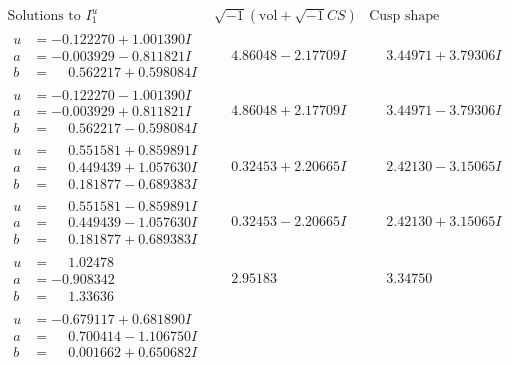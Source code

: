 \documentclass[1p]{elsarticle_modified}
\theoremstyle{definition}
\newcommand{\I}{\sqrt{-1}}
\begin{document}
$$\begin{array}{c|c|c}  
\text{Solutions to }I^u_{1}& \I (\text{vol} + \sqrt{-1}CS) & \text{Cusp shape}\\
 \hline 
\begin{aligned}
u &= -0.122270 + 1.001390 I \\
a &= -0.003929 - 0.811821 I \\
b &= \phantom{-}0.562217 + 0.598084 I\end{aligned}
 & \phantom{-}4.86048 - 2.17709 I & \phantom{-}3.44971 + 3.79306 I \\ \hline\begin{aligned}
u &= -0.122270 - 1.001390 I \\
a &= -0.003929 + 0.811821 I \\
b &= \phantom{-}0.562217 - 0.598084 I\end{aligned}
 & \phantom{-}4.86048 + 2.17709 I & \phantom{-}3.44971 - 3.79306 I \\ \hline\begin{aligned}
u &= \phantom{-}0.551581 + 0.859891 I \\
a &= \phantom{-}0.449439 + 1.057630 I \\
b &= \phantom{-}0.181877 - 0.689383 I\end{aligned}
 & \phantom{-}0.32453 + 2.20665 I & \phantom{-}2.42130 - 3.15065 I \\ \hline\begin{aligned}
u &= \phantom{-}0.551581 - 0.859891 I \\
a &= \phantom{-}0.449439 - 1.057630 I \\
b &= \phantom{-}0.181877 + 0.689383 I\end{aligned}
 & \phantom{-}0.32453 - 2.20665 I & \phantom{-}2.42130 + 3.15065 I \\ \hline\begin{aligned}
u &= \phantom{-}1.02478\phantom{ +0.000000I} \\
a &= -0.908342\phantom{ +0.000000I} \\
b &= \phantom{-}1.33636\phantom{ +0.000000I}\end{aligned}
 & \phantom{-}2.95183\phantom{ +0.000000I} & \phantom{-}3.34750\phantom{ +0.000000I} \\ \hline\begin{aligned}
u &= -0.679117 + 0.681890 I \\
a &= \phantom{-}0.700414 - 1.106750 I \\
b &= \phantom{-}0.001662 + 0.650682 I\end{aligned}

\end{array}$$
\end{document}
